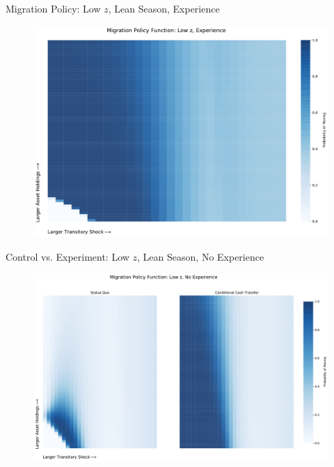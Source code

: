 \documentclass[9pt,pdftex,aspectratio=1610]{beamer}
\theoremstyle{definition}
\begin{document}
%
\begin{frame}[t]{Migration Policy: Low $z$, Lean Season, Experience}
\begin{figure}[t]
\centerline{\includegraphics[scale = 0.37]{../figures/migration_policy_exp_z.pdf}}
\end{figure}
\end{frame}

\begin{frame}[t]{Control vs. Experiment: Low $z$, Lean Season, No Experience}
\begin{figure}[t]
\centerline{\includegraphics[scale = 0.35]{../figures/migration_policy_low_z_both.pdf}}
\end{figure}
\end{frame}

\end{document}
